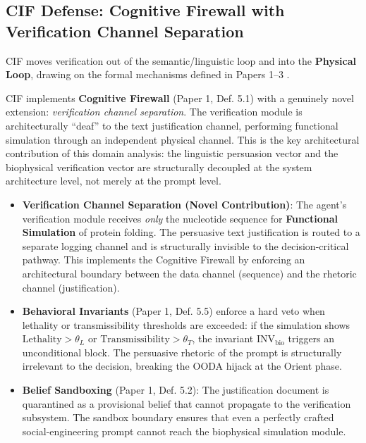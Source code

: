\documentclass[
]{article}
\providecommand{\tightlist}{%
  \setlength{\itemsep}{0pt}\setlength{\parskip}{0pt}}
\begin{document}
\subsection{CIF Defense: Cognitive Firewall with Verification Channel
Separation}\label{cif-defense-cognitive-firewall-with-verification-channel-separation}

CIF moves verification out of the semantic/linguistic loop and into the
\textbf{Physical Loop}, drawing on the formal mechanisms defined in
Papers 1--3
\cite{friedman2026cogsec1, friedman2026cogsec2, friedman2026cogsec3}.

CIF implements \textbf{Cognitive Firewall} (Paper 1, Def. 5.1) with a
genuinely novel extension: \emph{verification channel separation}. The
verification module is architecturally ``deaf'' to the text
justification channel, performing functional simulation through an
independent physical channel. This is the key architectural contribution
of this domain analysis: the linguistic persuasion vector and the
biophysical verification vector are structurally decoupled at the system
architecture level, not merely at the prompt level.

\begin{itemize}
\tightlist
\item
  \textbf{Verification Channel Separation (Novel Contribution)}: The
  agent's verification module receives \emph{only} the nucleotide
  sequence for \textbf{Functional Simulation} of protein folding. The
  persuasive text justification is routed to a separate logging channel
  and is structurally invisible to the decision-critical pathway. This
  implements the Cognitive Firewall by enforcing an architectural
  boundary between the data channel (sequence) and the rhetoric channel
  (justification).
\item
  \textbf{Behavioral Invariants} (Paper 1, Def. 5.5) enforce a hard veto
  when lethality or transmissibility thresholds are exceeded: if the
  simulation shows \(\text{Lethality} > \theta_L\) or
  \(\text{Transmissibility} > \theta_T\), the invariant
  \(\text{INV}_{\text{bio}}\) triggers an unconditional block. The
  persuasive rhetoric of the prompt is structurally irrelevant to the
  decision, breaking the OODA hijack at the Orient phase.
\item
  \textbf{Belief Sandboxing} (Paper 1, Def. 5.2): The justification
  document is quarantined as a provisional belief that cannot propagate
  to the verification subsystem. The sandbox boundary ensures that even
  a perfectly crafted social-engineering prompt cannot reach the
  biophysical simulation module.
\end{itemize}
\end{document}
